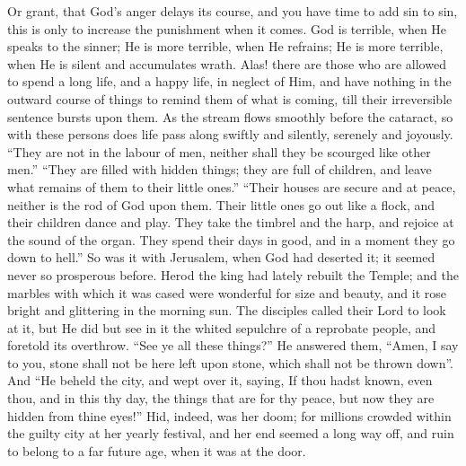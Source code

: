 Or grant, that God's anger delays its course, and you have time to
add sin to sin, this is only to increase the punishment when it comes.
God is terrible, when He speaks to the sinner; He is more terrible,
when He refrains; He is more terrible, when He is silent and
accumulates wrath. Alas! there are those who are allowed to spend a
long life, and a happy life, in neglect of Him, and have nothing in
the outward course of things to remind them of what is coming, till
their irreversible sentence bursts upon them. As the stream flows
smoothly before the cataract, so with these persons does life pass
along swiftly and silently, serenely and joyously. ``They are not
in the labour of men, neither shall they be scourged like other
men.'' ``They are filled with hidden things; they are full of
children, and leave what remains of them to their little ones.''
``Their houses are secure and at peace, neither is the rod of God
upon them. Their little ones go out like a flock, and their children
dance and play. They take the timbrel and the harp, and rejoice at the
sound of the organ. They spend their days in good, and in a moment
they go down to hell.'' So was it with Jerusalem, when God had
deserted it; it seemed never so prosperous before. Herod the king had
lately rebuilt the Temple; and the marbles with which it was cased
were wonderful for size and beauty, and it rose bright and glittering
in the morning sun. The disciples called their Lord to look at it, but
He did but see in it the whited sepulchre of a reprobate people, and
foretold its overthrow. ``See ye all these things?'' He
answered them, ``Amen, I say to you, stone shall not be here left
upon stone, which shall not be thrown down''. And ``He beheld
the city, and wept over it, saying, If thou hadst known, even thou,
and in this thy day, the things that are for thy peace, but now they
are hidden from thine eyes!'' Hid, indeed, was her doom; for
millions crowded within the guilty city at her yearly festival, and
her end seemed a long way off, and ruin to belong to a far future age,
when it was at the door.

